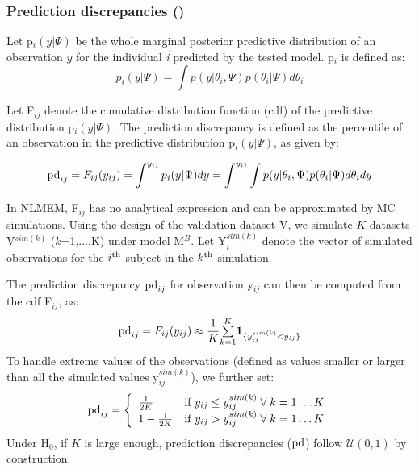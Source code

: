 \subsubsection{Prediction discrepancies (\pd)}

\hskip 18pt Let p$_{i}(y|\Psi)$ be the whole marginal posterior predictive distribution of an observation $y$ for the individual \emph{i} predicted by the tested model. p$_i$ is defined as:
$$p_{i}(y|\Psi)=\int p(y|\theta_{i},\Psi) p(\theta_{i}|\Psi)d\theta_{i}$$

Let F$_{ij}$ denote the cumulative distribution function (cdf) of the predictive distribution p$_{i}(y|\Psi)$. The prediction discrepancy is defined as the percentile of an observation in the predictive distribution p$_{i}(y|\Psi)$, as given by: 

$${\rm pd}_{ij}=F_{ij}(y_{ij})=\int^{y_{ij}} p_{i}(y|\Psi)dy=\int^{y_{ij}}\int p(y|\theta_{i},\Psi)p(\theta_{i}|\Psi)d\theta_{i}dy$$

In NLMEM, F$_{ij}$ has no analytical expression and can be approximated by MC simulations. Using the design of the validation dataset V, we simulate $K$ datasets V$^{sim(k)}$ ($k$=1,...,K) under model M$^B$. Let Y$_i^{sim(k)}$ denote the vector of simulated observations for the $i^{\rm th}$ subject in the $k^{\rm th}$ simulation. 

The prediction discrepancy ${\rm pd}_{ij}$ for observation y$_{ij}$ can then be computed from the cdf F$_{ij}$, as:
\begin{equation}
\pd_{ij} = F_{ij}(y_{ij}) \approx \frac{1}{K}{\textstyle \overset{K}{\underset{k=1}{\sum}}\boldsymbol{1}_{ \{y_{ij}^{sim(k)}<y_{ij} \}}} \label{eq:pdedef}
\end{equation}
To handle extreme values of the observations (defined as values smaller or larger than all the simulated values y$_{ij}^{sim(k)}$), we further set:
\begin{equation*}
{\rm pd}_{ij} = \left\{ \begin{array}{l r}
            \frac{1}{2K} & \text{if } y_{ij} \leq y_{ij}^{sim(k)} \; \forall \; k=1\ldots K \\
            1-\frac{1}{2K} & \text{if } y_{ij} > y_{ij}^{sim(k)} \; \forall \; k=1\ldots K \\
           \end{array}
\right.
\end{equation*}
Under H$_0$, if $K$ is large enough, prediction discrepancies (${\rm pd}$) follow $\mathcal{U}(0, 1)$ by construction.

